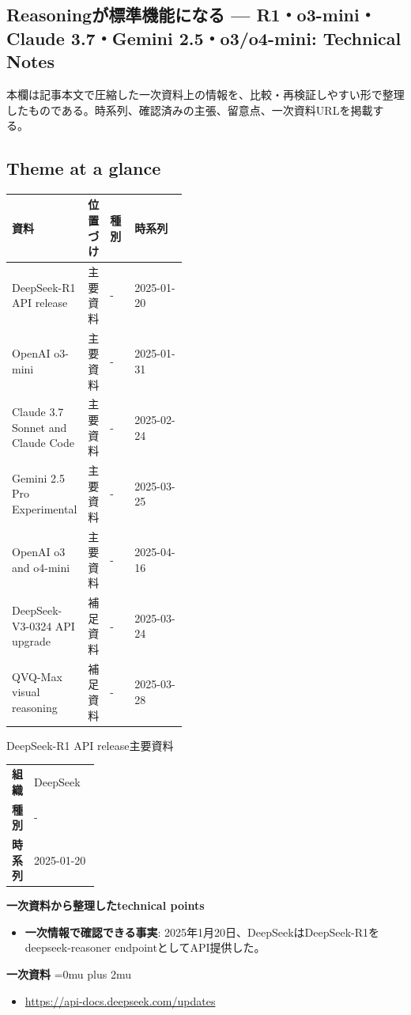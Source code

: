 \subsection*{Reasoningが標準機能になる — R1・o3-mini・Claude 3.7・Gemini 2.5・o3/o4-mini: Technical Notes}
本欄は記事本文で圧縮した一次資料上の情報を、比較・再検証しやすい形で整理したものである。時系列、確認済みの主張、留意点、一次資料URLを掲載する。
\medskip
\subsection*{Theme at a glance}
\begin{center}
\footnotesize
\begin{tabularx}{\linewidth}{@{}p{0.20\linewidth}p{0.10\linewidth}p{0.14\linewidth}X@{}}
\toprule
資料 & 位置づけ & 種別 & 時系列 \\
\midrule
DeepSeek-R1 API release & 主要資料 & - & 2025-01-20   \\
OpenAI o3-mini & 主要資料 & - & 2025-01-31   \\
Claude 3.7 Sonnet and Claude Code & 主要資料 & - & 2025-02-24   \\
Gemini 2.5 Pro Experimental & 主要資料 & - & 2025-03-25   \\
OpenAI o3 and o4-mini & 主要資料 & - & 2025-04-16   \\
DeepSeek-V3-0324 API upgrade & 補足資料 & - & 2025-03-24   \\
QVQ-Max visual reasoning & 補足資料 & - & 2025-03-28   \\
\bottomrule
\end{tabularx}
\end{center}
\normalsize

\begin{technicalnote}{DeepSeek-R1 API release}{主要資料}
\begingroup
\begin{tabularx}{\linewidth}{@{}>{\bfseries}p{0.22\linewidth}X@{}}
組織 & DeepSeek \\
種別 & - \\
時系列 & 2025-01-20 \\
\end{tabularx}
\smallskip
{\bfseries 一次資料から整理したtechnical points}
\begin{itemize}[leftmargin=1.5em,itemsep=0.35em]
\item \textbf{一次情報で確認できる事実}: 2025年1月20日、DeepSeekはDeepSeek-R1をdeepseek-reasoner endpointとしてAPI提供した。
\end{itemize}
\begin{samepage}
{\bfseries 一次資料}
\begingroup\sloppy
\Urlmuskip=0mu plus 2mu\relax
\begin{itemize}[leftmargin=1.5em,itemsep=0.25em]
\item {\scriptsize\url{https://api-docs.deepseek.com/updates}}
\end{itemize}
\endgroup
\end{samepage}
\endgroup
\end{technicalnote}
\medskip

